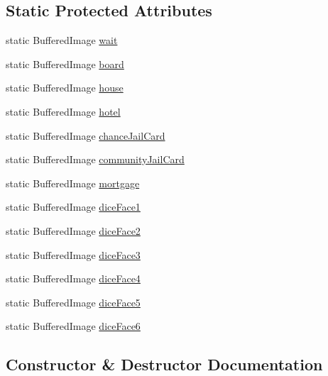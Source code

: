\subsection*{Static Protected Attributes}
\begin{DoxyCompactItemize}
\item 
static Buffered\+Image \hyperlink{class_monopoly_1_1_gui_1_1_images_load_a2aa38351567bba7feaafb3bc48bde590}{wait}
\item 
static Buffered\+Image \hyperlink{class_monopoly_1_1_gui_1_1_images_load_aa27f90f00ace7870fa2d223abd6c58de}{board}
\item 
static Buffered\+Image \hyperlink{class_monopoly_1_1_gui_1_1_images_load_a085be516ecb31d5b75d8a0219dc223d0}{house}
\item 
static Buffered\+Image \hyperlink{class_monopoly_1_1_gui_1_1_images_load_a6af54624772426e590e5e85d2ec98437}{hotel}
\item 
static Buffered\+Image \hyperlink{class_monopoly_1_1_gui_1_1_images_load_acefdcb1c9e76a2905db1e8eb42da0fb5}{chance\+Jail\+Card}
\item 
static Buffered\+Image \hyperlink{class_monopoly_1_1_gui_1_1_images_load_addf89cd2902287adb11639523bb9f57c}{community\+Jail\+Card}
\item 
static Buffered\+Image \hyperlink{class_monopoly_1_1_gui_1_1_images_load_af40cb07b349a5d377faf4b4caf9aa248}{mortgage}
\item 
static Buffered\+Image \hyperlink{class_monopoly_1_1_gui_1_1_images_load_abd14efa6c0aabf088bcbbd66f9fee913}{dice\+Face1}
\item 
static Buffered\+Image \hyperlink{class_monopoly_1_1_gui_1_1_images_load_a9954a27429882f62e70c7370b40a0d92}{dice\+Face2}
\item 
static Buffered\+Image \hyperlink{class_monopoly_1_1_gui_1_1_images_load_a68ed483671de4c35b0eac6e6589d8305}{dice\+Face3}
\item 
static Buffered\+Image \hyperlink{class_monopoly_1_1_gui_1_1_images_load_a074e7b0c9d1b5aa4990286525598fe5f}{dice\+Face4}
\item 
static Buffered\+Image \hyperlink{class_monopoly_1_1_gui_1_1_images_load_a823068f0758ae2ba3a60f46ccf4e1963}{dice\+Face5}
\item 
static Buffered\+Image \hyperlink{class_monopoly_1_1_gui_1_1_images_load_a3f5bcd589ba132617e82ad976ede69f5}{dice\+Face6}
\end{DoxyCompactItemize}


\subsection{Constructor \& Destructor Documentation}
